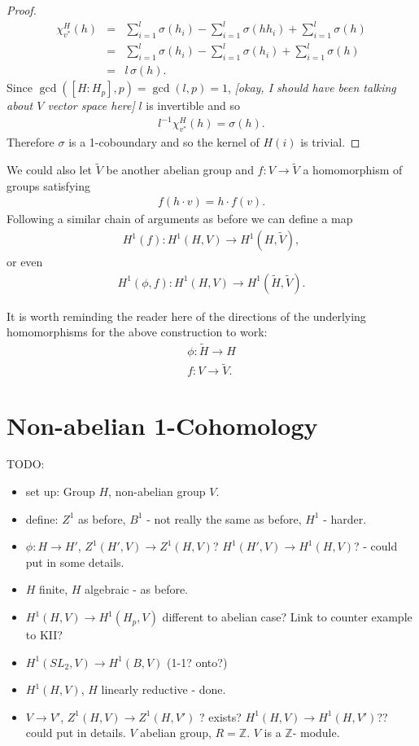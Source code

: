 \begin{proof}
\begin{eqnarray*}
	\chi_{v^*}^H(h) &=& \sum_{i = 1}^l\sigma(h_i) - \sum_{i = 1}^l \sigma(hh_i) +\sum_{i = 1}^l \sigma(h)\\
	&=& \sum_{i = 1}^l\sigma(h_i) - \sum_{i = 1}^l \sigma(h_i) +\sum_{i = 1}^l \sigma(h) \\
	&=& l\, \sigma(h).
\end{eqnarray*}
Since $\gcd([H:H_p], p) = \gcd(l,p) = 1$, \emph{[okay, I should have been talking about $V$ vector space here]} $l$ is invertible and so
\begin{eqnarray*}
	l^{-1}\chi_{v^*}^H(h) = \sigma(h).
\end{eqnarray*}
Therefore $\sigma$ is a 1-coboundary and so the kernel of $H(i)$ is trivial.
\end{proof}

We could also let $\tilde{V}$ be another abelian group and $f:V\rightarrow\tilde{V}$ a homomorphism of groups satisfying
\begin{eqnarray*}
	f ( h\cdot v) = h\cdot f(v).
\end{eqnarray*}
Following a similar chain of arguments as before we can define a map
\begin{eqnarray*}
	H^1(f):H^1(H, V)\rightarrow H^1(H, \tilde{V}),
\end{eqnarray*}
or even	
\begin{eqnarray*}
	H^1(\phi, f):H^1(H, V)\rightarrow H^1(\tilde{H}, \tilde{V}).
\end{eqnarray*}

It is worth reminding the reader here of the directions of the underlying homomorphisms for the above construction to work:
\begin{eqnarray*}
	\phi:\tilde{H} \rightarrow H \\
	f: V \rightarrow \tilde{V}.
\end{eqnarray*}

\section{Non-abelian 1-Cohomology}
TODO:
	\begin{itemize}
	\item set up: Group $H$, non-abelian group $V$.
	\item define: $Z^1$ as before, $B^1$ - not really the same as before, $H^1$ - harder.
	\item $\phi:H\rightarrow H'$, $Z^1(H', V)\rightarrow Z^1(H, V)$?
	$H^1(H', V)\rightarrow H^1(H, V)$?
	- could put in some details.
	\item $H$ finite, $H$ algebraic - as before.
	\item $H^1(H, V) \rightarrow H^1(H_p, V)$ different to abelian case? Link to counter example to KII?
	\item $H^1(SL_2, V) \rightarrow H^1(B, V)$ (1-1? onto?)
	\item $H^1(H, V)$, $H$ linearly reductive - done.
	\item $V\rightarrow V'$, $Z^1(H, V) \rightarrow Z^1(H, V')$ ? exists?
	$H^1(H, V) \rightarrow H^1(H, V')$??
	could put in details.
	$V$ abelian group, $R=\mathbb{Z}$. $V$ is a $\mathbb{Z}$- module.
	\end{itemize}
	
